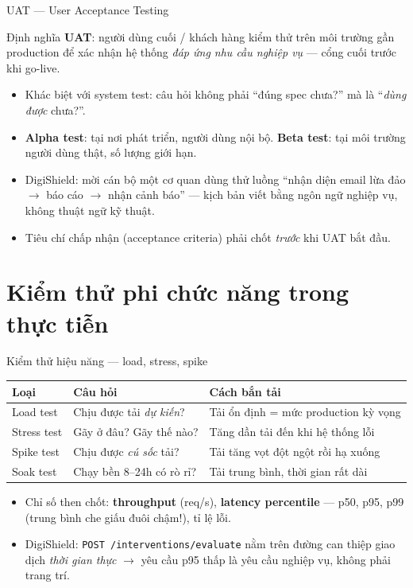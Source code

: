 \documentclass[aspectratio=169,12pt]{beamer}
\begin{document}
\begin{frame}{UAT --- User Acceptance Testing}
  \begin{block}{Định nghĩa}
    \textbf{UAT}: người dùng cuối / khách hàng kiểm thử trên môi trường gần production để xác nhận hệ thống \emph{đáp ứng nhu cầu nghiệp vụ} --- cổng cuối trước khi go-live.
  \end{block}
  \begin{itemize}
    \item Khác biệt với system test: câu hỏi không phải ``đúng spec chưa?'' mà là ``\emph{dùng được} chưa?''.
    \item \textbf{Alpha test}: tại nơi phát triển, người dùng nội bộ. \textbf{Beta test}: tại môi trường người dùng thật, số lượng giới hạn.
    \item DigiShield: mời cán bộ một cơ quan dùng thử luồng ``nhận diện email lừa đảo $\rightarrow$ báo cáo $\rightarrow$ nhận cảnh báo'' --- kịch bản viết bằng ngôn ngữ nghiệp vụ, không thuật ngữ kỹ thuật.
    \item Tiêu chí chấp nhận (acceptance criteria) phải chốt \emph{trước} khi UAT bắt đầu.
  \end{itemize}
\end{frame}

\section{Kiểm thử phi chức năng trong thực tiễn}

\begin{frame}{Kiểm thử hiệu năng --- load, stress, spike}
  \small
  \begin{table}
    \begin{tabular}{@{}lll@{}}
      \toprule
      \textbf{Loại} & \textbf{Câu hỏi} & \textbf{Cách bắn tải} \\
      \midrule
      Load test & Chịu được tải \emph{dự kiến}? & Tải ổn định = mức production kỳ vọng \\
      Stress test & Gãy ở đâu? Gãy thế nào? & Tăng dần tải đến khi hệ thống lỗi \\
      Spike test & Chịu được \emph{cú sốc} tải? & Tải tăng vọt đột ngột rồi hạ xuống \\
      Soak test & Chạy bền 8--24h có rò rỉ? & Tải trung bình, thời gian rất dài \\
      \bottomrule
    \end{tabular}
  \end{table}
  \begin{itemize}
    \item Chỉ số then chốt: \textbf{throughput} (req/s), \textbf{latency percentile} --- p50, \alert{p95}, p99 (trung bình che giấu đuôi chậm!), tỉ lệ lỗi.
    \item DigiShield: \texttt{POST /interventions/evaluate} nằm trên đường can thiệp giao dịch \emph{thời gian thực} $\rightarrow$ yêu cầu p95 thấp là yêu cầu nghiệp vụ, không phải trang trí.
  \end{itemize}
\end{frame}
\end{document}
